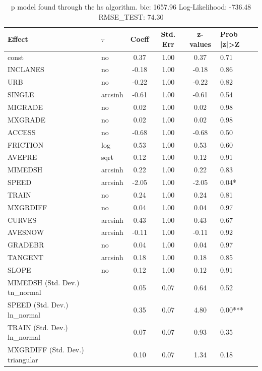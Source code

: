 \begin{table}
	\caption{p model found through the hs algorithm. bic: 1657.96 Log-Likelihood: -736.48 RMSE_TEST: 74.30}
	\begin{center}
		\begin{tabular}{|l|l|c|c|c|l|}
			\hline
			Effect & $\tau$ & Coeff & Std. Err & z-values & Prob |z|>Z \\
			\hline
			const & no & 0.37 & 1.00 & 0.37 & 0.71 \\
			\hline
			INCLANES & no & -0.18 & 1.00 & -0.18 & 0.86 \\
			\hline
			URB & no & -0.22 & 1.00 & -0.22 & 0.82 \\
			\hline
			SINGLE & arcsinh & -0.61 & 1.00 & -0.61 & 0.54 \\
			\hline
			MIGRADE & no & 0.02 & 1.00 & 0.02 & 0.98 \\
			\hline
			MXGRADE & no & 0.02 & 1.00 & 0.02 & 0.98 \\
			\hline
			ACCESS & no & -0.68 & 1.00 & -0.68 & 0.50 \\
			\hline
			FRICTION & log & 0.53 & 1.00 & 0.53 & 0.60 \\
			\hline
			AVEPRE & sqrt & 0.12 & 1.00 & 0.12 & 0.91 \\
			\hline
			MIMEDSH & arcsinh & 0.22 & 1.00 & 0.22 & 0.83 \\
			\hline
			SPEED & arcsinh & -2.05 & 1.00 & -2.05 & 0.04* \\
			\hline
			TRAIN & no & 0.24 & 1.00 & 0.24 & 0.81 \\
			\hline
			MXGRDIFF & no & 0.04 & 1.00 & 0.04 & 0.97 \\
			\hline
			CURVES & arcsinh & 0.43 & 1.00 & 0.43 & 0.67 \\
			\hline
			AVESNOW & arcsinh & -0.11 & 1.00 & -0.11 & 0.92 \\
			\hline
			GRADEBR & no & 0.04 & 1.00 & 0.04 & 0.97 \\
			\hline
			TANGENT & arcsinh & 0.18 & 1.00 & 0.18 & 0.85 \\
			\hline
			SLOPE & no & 0.12 & 1.00 & 0.12 & 0.91 \\
			\hline
			MIMEDSH (Std. Dev.) tn_normal &  & 0.05 & 0.07 & 0.64 & 0.52 \\
			\hline
			SPEED (Std. Dev.) ln_normal &  & 0.35 & 0.07 & 4.80 & 0.00*** \\
			\hline
			TRAIN (Std. Dev.) ln_normal &  & 0.07 & 0.07 & 0.93 & 0.35 \\
			\hline
			MXGRDIFF (Std. Dev.) triangular &  & 0.10 & 0.07 & 1.34 & 0.18 \\

\end{tabular}
\end{center}
\end{table}

